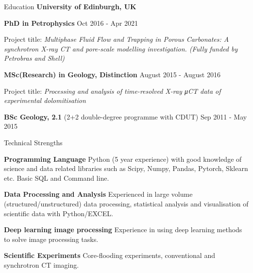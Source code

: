 \documentclass{resume} %
\newenvironment{indentpar}[1]%
  {\begin{list}{}%
          {\setlength{\leftmargin}{#1}}%
          \item[]%
  }
  {\end{list}}
\begin{document}
\begin{rSection}{Education}
{\bf University of Edinburgh, UK} 
\begin{indentpar}{0.5cm}

\textbf{PhD in Petrophysics} \hfill {Oct 2016 - Apr 2021}
\begin{indentpar}{0.5cm}
Project title: \textit{Multiphase Fluid Flow and Trapping in Porous Carbonates: A synchrotron X-ray CT and pore-scale modelling investigation. (Fully funded by Petrobras and Shell)}
\end{indentpar}
\textbf{    MSc(Research) in Geology, Distinction} \hfill {August 2015 - August 2016} 
\begin{indentpar}{0.5cm}
Project title: \textit {Processing and analysis of time-resolved X-ray μCT data of experimental dolomitisation}
\end{indentpar}
\textbf{    BSc Geology, 2.1} (2+2 double-degree programme with CDUT) \hfill {Sep 2011 - May 2015} 
\end{indentpar}
\end{rSection}
\begin{rSection}{Technical Strengths}

\begin{indentpar}{0.5cm}
\textbf{Programming Language} Python (5 year experience) with good knowledge of science and data related libraries such as Scipy, Numpy, Pandas, Pytorch, Sklearn etc. Basic SQL and Command line.

\textbf{Data Processing and Analysis}  Experienced in large volume (structured/unstructured) data processing, statistical analysis and visualisation of scientific data with Python/EXCEL.

\textbf{Deep learning image processing} Experience in using deep learning methods to solve image processing tasks.

\textbf{Scientific Experiments} Core-flooding experiments, conventional and synchrotron CT imaging. 
\end{indentpar}
\end{rSection}

\end{document}
